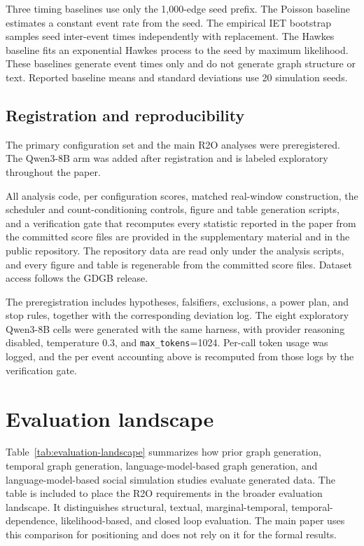 Three timing baselines use only the 1,000-edge seed prefix. The Poisson
baseline estimates a constant event rate from the seed. The empirical IET
bootstrap samples seed inter-event times independently with replacement. The
Hawkes baseline fits an exponential Hawkes process to the seed by maximum
likelihood. These baselines generate event times only and do not generate graph
structure or text. Reported baseline means and standard deviations use 20
simulation seeds.

\subsection{Registration and reproducibility}
\label{app:repro}

The primary configuration set and the main R2O analyses were preregistered.
The Qwen3-8B arm was added after registration and is labeled exploratory
throughout the paper.

All analysis code, per configuration scores, matched real-window construction,
the scheduler and count-conditioning controls, figure and table generation
scripts, and a verification gate that recomputes every statistic reported in
the paper from the committed score files are provided in the
supplementary material and in the public repository. The repository data are read only under the analysis
scripts, and every figure and table is regenerable from the committed score
files. Dataset access follows the GDGB release.

The preregistration includes hypotheses, falsifiers, exclusions, a power plan,
and stop rules, together with the corresponding deviation log. The eight
exploratory Qwen3-8B cells were generated with the same harness, with provider
reasoning disabled, temperature 0.3, and \texttt{max\_tokens}=1024. Per-call
token usage was logged, and the per event accounting above is recomputed from
those logs by the verification gate.


\section{Evaluation landscape}
\label{app:landscape}

Table~\ref{tab:evaluation-landscape} summarizes how prior graph generation,
temporal graph generation, language-model-based graph generation, and
language-model-based social simulation studies evaluate generated data. The
table is included to place the R2O requirements in the broader evaluation
landscape. It distinguishes structural, textual, marginal-temporal,
temporal-dependence, likelihood-based, and closed loop evaluation. The main
paper uses this comparison for positioning and does not rely on it for the
formal results.

